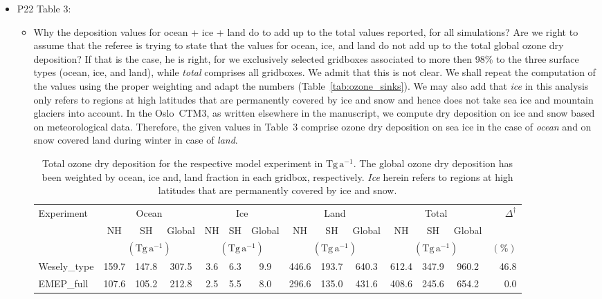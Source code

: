 \documentclass{scrartcl}
\begin{document}
\begin{itemize}
\item {\color{blue}  P22 Table 3:}
  \begin{itemize}
  \item {\color{blue}  Why the deposition values for ocean + ice + land do to add up to the total
    values reported, for all simulations?}
    Are we right to assume that the referee is trying to state that the values for ocean, ice, and land do
    not add up to the total global ozone dry deposition? If that is the case, he is right, for we exclusively
    selected gridboxes associated to more then 98\% to the three surface types (ocean, ice, and land), while
    \emph{total} comprises all gridboxes. We admit that this is not clear.
    We shall repeat the computation of the values using the proper weighting and adapt the numbers (Table~\ref{tab:ozone_sinks}).
    We may also add that \emph{ice} in this analysis only
    refers to regions at high latitudes that are permanently covered by ice and snow and hence does not take
    sea ice and mountain glaciers into account. In the Oslo~CTM3, as written elsewhere in the manuscript, we
    compute dry deposition on ice and snow based on meteorological data. Therefore, the given values in Table~3
    comprise ozone dry deposition on sea ice in the case of \emph{ocean} and on snow covered land during winter
    in case of \emph{land}.
    \begin{table*}[t]
  \caption{Total ozone dry deposition for the respective model experiment in $\mathrm{Tg\,a^{-1}}$. The global ozone dry deposition has been weighted by ocean, ice and, land fraction in each gridbox, respectively. \emph{Ice} herein refers to regions at high latitudes that are permanently covered by ice and snow.}
  \begin{tabular}{lccccccccc|cccr}
    \hline
    \multirow{3}{*}{Experiment} & \multicolumn{3}{c}{Ocean} & \multicolumn{3}{c}{Ice} & \multicolumn{3}{c}{Land} & \multicolumn{3}{c}{Total} & $\Delta^\dagger$\\
    & NH & SH & Global & NH & SH & Global & NH & SH & Global & NH & SH & Global\\
    & \multicolumn{3}{c}{$(\mathrm{Tg\,a^{-1}})$} & \multicolumn{3}{c}{$(\mathrm{Tg\,a^{-1}})$} & \multicolumn{3}{c}{$(\mathrm{Tg\,a^{-1}})$} & \multicolumn{3}{c}{$(\mathrm{Tg\,a^{-1}})$} & $(\mathrm{\%})$\\
    \hline
    Wesely\_type & 159.7 & 147.8 & 307.5 & 3.6 & 6.3 & 9.9 & 446.6 & 193.7 & 640.3 & 612.4 & 347.9 & 960.2 & 46.8\\
    EMEP\_full & 107.6 & 105.2 & 212.8 & 2.5 & 5.5 & 8.0 & 296.6 & 135.0 & 431.6 & 408.6 & 245.6 & 654.2 & 0.0\\

\end{tabular}
\end{table*}
\end{itemize}
\end{itemize}
\end{document}

